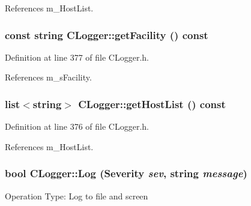 References m\_\-Host\-List.
\subsubsection{\setlength{\rightskip}{0pt plus 5cm}const string CLogger::get\-Facility () const\hspace{0.3cm}{\tt  [inline, private]}}\label{classCLogger_c3}




Definition at line 377 of file CLogger.h.

References m\_\-s\-Facility.
\subsubsection{\setlength{\rightskip}{0pt plus 5cm}list$<$string$>$ CLogger::get\-Host\-List () const\hspace{0.3cm}{\tt  [inline, private]}}\label{classCLogger_c2}




Definition at line 376 of file CLogger.h.

References m\_\-Host\-List.
\subsubsection{\setlength{\rightskip}{0pt plus 5cm}bool CLogger::Log ({\bf Severity} {\em sev}, string {\em message})}\label{classCLogger_a3}


Operation Type: Log to file and screen


